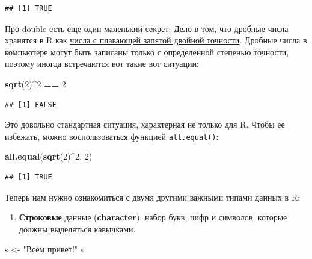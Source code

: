 \documentclass[]{book}
\newenvironment{Shaded}{\begin{snugshade}}{\end{snugshade}}
\newcommand{\KeywordTok}[1]{\textcolor[rgb]{0.13,0.29,0.53}{\textbf{#1}}}
\newcommand{\DecValTok}[1]{\textcolor[rgb]{0.00,0.00,0.81}{#1}}
\newcommand{\StringTok}[1]{\textcolor[rgb]{0.31,0.60,0.02}{#1}}
\newcommand{\OperatorTok}[1]{\textcolor[rgb]{0.81,0.36,0.00}{\textbf{#1}}}
\newcommand{\NormalTok}[1]{#1}
\providecommand{\tightlist}{%
  \setlength{\itemsep}{0pt}\setlength{\parskip}{0pt}}
\begin{document}
\begin{verbatim}
## [1] TRUE
\end{verbatim}

Про double есть еще один маленький секрет. Дело в том, что дробные числа
хранятся в R как
\href{https://ru.wikipedia.org/wiki/Число_двойной_точности}{числа с
плавающей запятой двойной точности}. Дробные числа в компьютере могут
быть записаны только с определенной степенью точности, поэтому иногда
встречаются вот такие вот ситуации:

\begin{Shaded}
\begin{Highlighting}[]
\KeywordTok{sqrt}\NormalTok{(}\DecValTok{2}\NormalTok{)}\OperatorTok{^}\DecValTok{2} \OperatorTok{==}\StringTok{ }\DecValTok{2}
\end{Highlighting}
\end{Shaded}

\begin{verbatim}
## [1] FALSE
\end{verbatim}

Это довольно стандартная ситуация, характерная не только для R. Чтобы ее
избежать, можно воспользоваться функцией \texttt{all.equal()}:

\begin{Shaded}
\begin{Highlighting}[]
\KeywordTok{all.equal}\NormalTok{(}\KeywordTok{sqrt}\NormalTok{(}\DecValTok{2}\NormalTok{)}\OperatorTok{^}\DecValTok{2}\NormalTok{, }\DecValTok{2}\NormalTok{)}
\end{Highlighting}
\end{Shaded}

\begin{verbatim}
## [1] TRUE
\end{verbatim}

Теперь нам нужно ознакомиться с двумя другими важными типами данных в R:

\begin{enumerate}
\def\labelenumi{\arabic{enumi}.}
\tightlist
\item
  \textbf{Строковые} данные (\textbf{character}): набор букв, цифр и
  символов, которые должны выделяться кавычками.
\end{enumerate}

\begin{Shaded}
\begin{Highlighting}[]
\NormalTok{s <-}\StringTok{ "Всем привет!"}
\NormalTok{s}
\end{Highlighting}
\end{Shaded}
\end{document}
